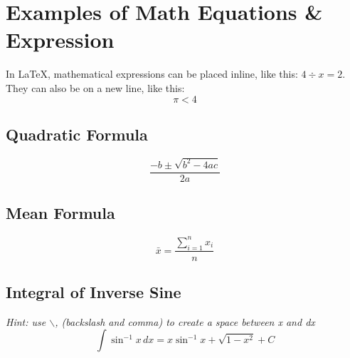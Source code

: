 \section{Examples of Math Equations \& Expression}
{In LaTeX, mathematical expressions can be placed inline, like this: \(4 \div x = 2\). They can also be on a new line, like this: \[\pi < 4\]}

\subsection{Quadratic Formula}
{\[\frac{-b\pm\sqrt{b^2-4ac}}{2a}\]}

\subsection{Mean Formula}
{\[\bar{x} = \frac{\sum_{i=1}^{n} x_i}{n}\]}

\subsection{Integral of Inverse Sine}
{\textit{Hint: use $\backslash$, (backslash and comma) to create a space between x and dx}\[\int\sin^{-1}x\,dx = x\sin^{-1}x + \sqrt{1-x^2} + C\]}
